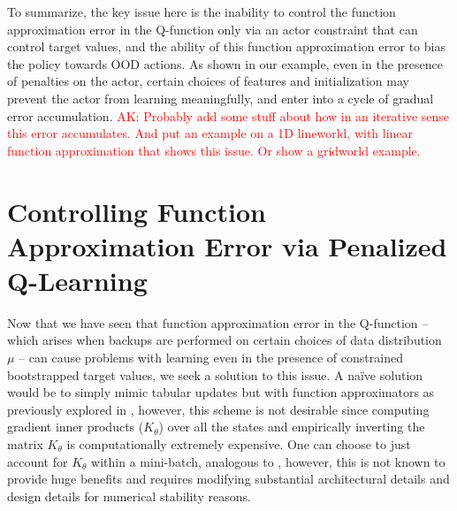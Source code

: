 To summarize, the key issue here is the inability to control the function approximation error in the Q-function only via an actor constraint that can control target values, and the ability of this function approximation error to bias the policy towards OOD actions. As shown in our example, even in the presence of penalties on the actor, certain choices of features and initialization may prevent the actor from learning meaningfully, and enter into a cycle of gradual error accumulation. 
\textcolor{red}{AK: Probably add some stuff about how in an iterative sense this error accumulates. And put an example on a 1D lineworld, with linear function approximation that shows this issue. Or show a gridworld example.}


\section{Controlling Function Approximation Error via Penalized Q-Learning}

Now that we have seen that function approximation error in the Q-function -- which arises when backups are performed on certain choices of data distribution $\mu$ -- can cause problems with learning even in the presence of constrained bootstrapped target values, we seek a solution to this issue. A na\"ive solution would be to simply mimic tabular updates but with function approximators as previously explored in \citet{achiam2019towards}, however, this scheme is not desirable since computing gradient inner products ($K_\theta$) over all the states and empirically inverting the matrix $K_\theta$ is computationally extremely expensive. One can choose to just account for $K_\theta$ within a mini-batch, analogous to \citet{achiam2019towards}, however, this is not known to provide huge benefits and requires modifying substantial architectural details and design details for numerical stability reasons.

